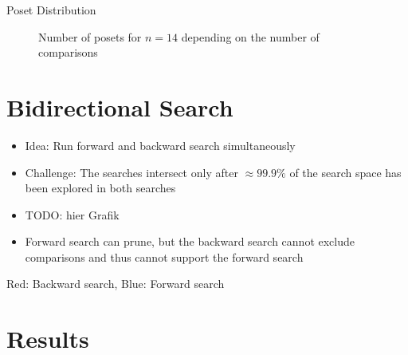 \begin{frame}{Poset Distribution}
  \begin{figure}[!b]
    \centering
    \resizebox{0.9\textheight}{!}{%
      
    }
    \caption{Number of posets for $n = 14$ depending on the number of comparisons}
  \end{figure}
\end{frame}


\section{Bidirectional Search}
\sectionframe{\insertsection}
\begin{frame}{\insertsection}
  \begin{itemize}
    \item<+-> Idea: Run forward and backward search simultaneously
    \item<+-> Challenge: The searches intersect only after $\approx 99.9\%$ of the search space has been explored in both searches
    \item TODO: hier Grafik
    \item<+-> Forward search can prune, but the backward search cannot exclude comparisons and thus cannot support the forward search
  \end{itemize}
\end{frame}

\begin{frame}{\insertsection}
  \begin{figure}[!b]
    \centering
    \renewcommand{\arraystretch}{0.9}
    \resizebox{0.85\textheight}{!}{%
      
      \label{fig:massen}
    }
  \end{figure}

  {\color{red} Red: Backward search},
  {\color{blue} Blue: Forward search}

\end{frame}


\section{Results}

